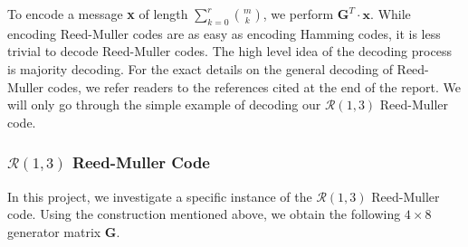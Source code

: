 \documentclass[12pt, a4paper]{article}
\begin{document}
To encode a message \textbf{x} of length $\sum_{k=0}^{r} \binom{m}{k}$, we perform $\textbf{G}^T \cdot \textbf{x}$. While encoding Reed-Muller codes are as easy as encoding Hamming codes, it is less trivial to decode Reed-Muller codes. The high level idea of the decoding process is majority decoding. For the exact details on the general decoding of Reed-Muller codes, we refer readers to the references cited at the end of the report. We will only go through the simple example of decoding our $\mathcal{R}(1,3)$ Reed-Muller code.







\subsubsection{$\mathcal{R}(1,3)$ Reed-Muller Code}
In this project, we investigate a specific instance of the $\mathcal{R}(1,3)$ Reed-Muller code. Using the construction mentioned above, we obtain the following $4 \times 8$ generator matrix \textbf{G}.
\end{document}
